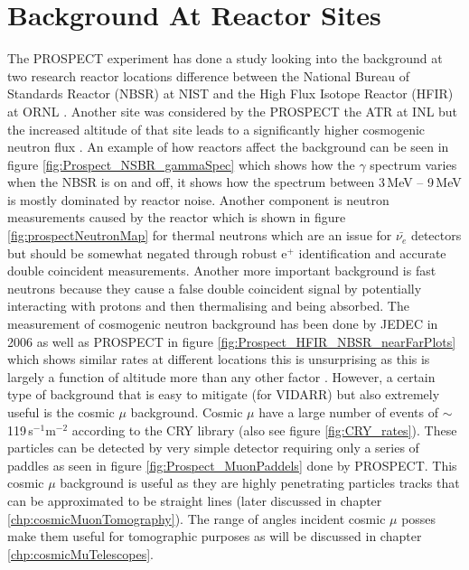 \section{Background At Reactor Sites}
The PROSPECT experiment has done a  study looking into the background at two research reactor locations difference between the National Bureau of Standards Reactor (NBSR) at NIST and the High Flux Isotope Reactor (HFIR) at ORNL \cite{Ashenfelter_2016}. Another site was considered by the PROSPECT the ATR at INL but the increased altitude of that site leads to a significantly higher cosmogenic neutron flux \cite{Ashenfelter_2016}. An example of how reactors affect the background can be seen in figure \ref{fig:Prospect_NSBR_gammaSpec} which shows how the $\gamma$ spectrum varies when the NBSR is on and off, it shows how the spectrum between 3\,MeV -- 9\,MeV is mostly dominated by reactor noise. Another component is neutron measurements caused by the reactor which is shown in figure \ref{fig:prospectNeutronMap} for thermal neutrons which are an issue for $\bar{\nu_e}$ detectors but should be somewhat negated through robust e$^+$ identification and accurate double coincident measurements. Another more important background is fast neutrons because they cause a false double coincident signal by potentially interacting with protons and then thermalising and being absorbed. The measurement of cosmogenic neutron background has been done by JEDEC in 2006 \cite{JEDEC_2006} as well as PROSPECT in figure \ref{fig:Prospect_HFIR_NBSR_nearFarPlots} which shows similar rates at different locations this is unsurprising as this is largely a function of altitude more than any other factor \cite{Ashenfelter_2016}. However, a certain type of background that is easy to mitigate (for VIDARR) but also extremely useful is the cosmic $\mu$ background. Cosmic $\mu$ have a large number of events of $\sim$ 119\,s$^{-1}$m$^{-2}$ according to the CRY library \cite{ieee_cry_2007} (also see figure \ref{fig:CRY_rates}). These particles can be detected by very simple detector requiring only a series of paddles as seen in figure \ref{fig:Prospect_MuonPaddels} done by PROSPECT. This cosmic $\mu$ background is useful as they are highly penetrating particles tracks that can be approximated to be straight lines (later discussed in chapter \ref{chp:cosmicMuonTomography}). The range of angles incident cosmic $\mu$ posses make them useful for tomographic purposes as will be discussed in chapter \ref{chp:cosmicMuTelescopes}. %


